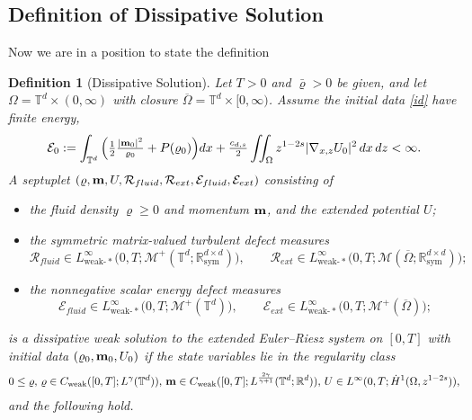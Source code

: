 \documentclass[12pt,a4paper,twoside]{article}
\newcommand{\vr}{\varrho}
\newcommand{\vc}[1]{{\bf #1}}
\newcommand{\Grad}{\nabla}
\newtheorem{df}{Definition}
\numberwithin{equation}{section}%
\newcommand{\vm}{\vc{m}}
\begin{document}
	\subsection{Definition of Dissipative Solution}
	Now we are in a position to state the definition
	
	\begin{df}[Dissipative Solution]\label{def:dissipative_weak_sol}
		Let $T>0$ and $\bar{\vr}>0$ be given, and let $\Omega=\mathbb T^d\times(0,\infty)$ with closure
		$\overline\Omega=\mathbb T^d\times[0,\infty)$. Assume the initial data \eqref{id} have finite energy,
		\begin{align}\label{eq:E0}
			\mathcal E_0 := \int_{\mathbb T^d}\Big(\tfrac12\tfrac{|\vm_0|^2}{\vr_0}+P(\vr_0)\Big)dx
			+ \tfrac{c_{d,s}}2\iint_\Omega z^{1-2s}|\Grad_{x,z}U_0|^2\,dx\,dz <\infty .
		\end{align}
		A septuplet $(\vr,\vm,U,\mathcal R_{fluid},\mathcal R_{ext},\mathcal E_{fluid},\mathcal E_{ext})$ consisting of
		\begin{itemize}[leftmargin=*]
			\item the fluid density $\vr\ge0$ and momentum $\vm$, and the extended potential $U$;
			\item the symmetric matrix-valued \emph{turbulent defect measures}
			\[
			\mathcal R_{fluid}\in L^\infty_{\mathrm{weak}\text{-}*}\big(0,T;\mathcal M^+(\mathbb T^d;\mathbb R^{d\times d}_{\mathrm{sym}})\big),
			\qquad
			\mathcal R_{ext}\in L^\infty_{\mathrm{weak}\text{-}*}\big(0,T;\mathcal M(\overline\Omega;\mathbb R^{d\times d}_{\mathrm{sym}})\big);
			\]
			\item the nonnegative scalar \emph{energy defect measures}
			\[
			\mathcal E_{fluid}\in L^\infty_{\mathrm{weak}\text{-}*}\big(0,T;\mathcal M^+(\mathbb T^d)\big),
			\qquad
			\mathcal E_{ext}\in L^\infty_{\mathrm{weak}\text{-}*}\big(0,T;\mathcal M^+(\overline\Omega)\big);
			\]
		\end{itemize}
		is a \emph{dissipative weak solution} to the extended Euler--Riesz system on $[0,T]$ with initial
		data $(\vr_0,\vm_0,U_0)$ if the state variables lie in the regularity class
		\begin{align}\label{regclass}
			0\leq \vr,\,
			\vr\in C_{\mathrm{weak}}([0,T];L^\gamma(\mathbb T^d)),\,
			\vm\in C_{\mathrm{weak}}([0,T];L^{\frac{2\gamma}{\gamma+1}}(\mathbb T^d;\mathbb R^d)),\,
			U\in L^\infty(0,T;\dot H^1(\Omega,z^{1-2s})),
		\end{align}
		and the following hold.
		\begin{enumerate}[leftmargin=*]

\end{enumerate}
\end{df}
\end{document}
